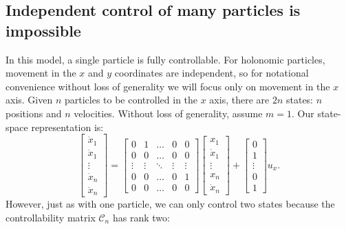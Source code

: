 \subsection{Independent control of many particles is impossible}
In this model, a single particle is fully controllable. For holonomic particles, movement in the $x$ and $y$ coordinates are independent, so for notational convenience without loss of generality we will focus only on movement in the $x$ axis. Given $n$ particles to be  controlled in the $x$ axis, there are $2n$ states: $n$ positions and $n$ velocities. Without loss of generality, assume $m=1$.
Our state-space representation is:
\begin{equation}
\begin{bmatrix}
\dot{x}_{1}\\ 
\ddot{x}_{1}\\
\vdots\\
\dot{x}_{n}\\
\ddot{x}_{n}

\end{bmatrix} = \begin{bmatrix}
0 & 1 & \ldots & 0 & 0 \\
0 & 0 & \ldots& 0 & 0 \\
\vdots &  \vdots & \ddots & \vdots & \vdots \\
0 & 0  & \ldots & 0 & 1 \\
0 & 0 & \ldots& 0 & 0 
\end{bmatrix}  \begin{bmatrix}
x_{1}\\
\dot{x}_{1}\\
\vdots \\
x_{n}\\
\dot{x}_{n}
\end{bmatrix} + \begin{bmatrix}
0\\
1\\
\vdots\\
0\\
1
\end{bmatrix} u_x.
\end{equation}
 However, just as with one particle, we can only control two states because the controllability matrix $\mathcal{C}_n$ has rank two:

